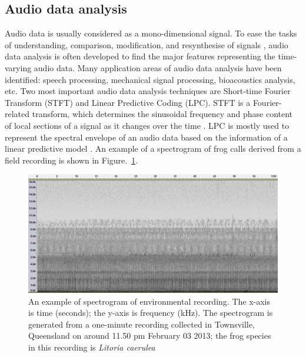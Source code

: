 \subsection{Audio data analysis}
Audio data is usually considered as a mono-dimensional signal. To ease the tasks of understanding, comparison, modification, and resynthesise of signals \citep{rocchesso2003introduction}, audio data analysis is often developed to find the major features representing the time-varying audio data. Many application areas of audio data analysis have been identified: speech processing, mechanical signal processing, bioacoustics analysis, etc. Two most important audio data analysis techniques are Short-time Fourier Transform (STFT) and Linear Predictive Coding (LPC). STFT is a Fourier-related transform, which determines the sinusoidal frequency and phase content of local sections of a signal as it changes over the time \citep{allen1997short}. LPC is mostly used to represent the spectral envelope of an audio data based on the information of a linear predictive model \citep{deng2003speech}. An example of a spectrogram of frog calls derived from a field recording is shown in Figure.~\ref{fig:Ch1_spectrogram}.

\begin{figure}[htb!]
\centering
\includegraphics[width=\textwidth]{image/spectrogram_example.png}
\caption[An example of spectrogram of environmental recording]{An example of spectrogram of environmental recording. The x-axis is time (seconds); the y-axis is frequency (kHz). The spectrogram is generated from a one-minute recording collected in Townsville, Queensland on around 11.50 pm February 03 2013; the frog species in this recording is \textit{Litoria caerulea}}
\label{fig:Ch1_spectrogram}
\end{figure}





